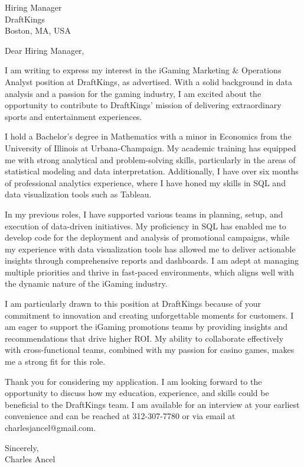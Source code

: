 \documentclass{letter}
\begin{document}
\begin{letter}{Hiring Manager\\DraftKings\\Boston, MA, USA}

\opening{Dear Hiring Manager,}

I am writing to express my interest in the iGaming Marketing \& Operations Analyst position at DraftKings, as advertised. With a solid background in data analysis and a passion for the gaming industry, I am excited about the opportunity to contribute to DraftKings' mission of delivering extraordinary sports and entertainment experiences.

I hold a Bachelor's degree in Mathematics with a minor in Economics from the University of Illinois at Urbana-Champaign. My academic training has equipped me with strong analytical and problem-solving skills, particularly in the areas of statistical modeling and data interpretation. Additionally, I have over six months of professional analytics experience, where I have honed my skills in SQL and data visualization tools such as Tableau.

In my previous roles, I have supported various teams in planning, setup, and execution of data-driven initiatives. My proficiency in SQL has enabled me to develop code for the deployment and analysis of promotional campaigns, while my experience with data visualization tools has allowed me to deliver actionable insights through comprehensive reports and dashboards. I am adept at managing multiple priorities and thrive in fast-paced environments, which aligns well with the dynamic nature of the iGaming industry.

I am particularly drawn to this position at DraftKings because of your commitment to innovation and creating unforgettable moments for customers. I am eager to support the iGaming promotions teams by providing insights and recommendations that drive higher ROI. My ability to collaborate effectively with cross-functional teams, combined with my passion for casino games, makes me a strong fit for this role.

Thank you for considering my application. I am looking forward to the opportunity to discuss how my education, experience, and skills could be beneficial to the DraftKings team. I am available for an interview at your earliest convenience and can be reached at 312-307-7780 or via email at charlesjancel@gmail.com.

\begin{flushleft}
Sincerely,\\
Charles Ancel
\end{flushleft}

\end{letter}
\end{document}
